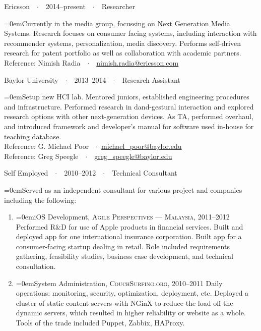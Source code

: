\documentclass[a4paper]{scrartcl}
\newcommand{\Description}[1]{\hangindent=0em\hangafter=0\noindent\footnotesize{#1}\par\normalsize\vspace{1em}} %
\newcommand{\Redvline}[0]{\vspace{0.5em}\noindent{\color{ThemeColor}\rule{16cm}{0.4pt}}}
\newcommand{\MyName}[1]{\noindent{\textsc{\LARGE{\color{ThemeColor}#1}}}} %
\newcommand{\NewBlock}[3]{
    #1\ \ $\cdotp$\ \ #2\ \ $\cdotp$\ \ #3}
\newcommand{\BlockTitle}[1]{\textsc{\vspace{0.15em}}\noindent{\spacedlowsmallcaps{#1}}\vspace{1em}}
\begin{document}

\Redvline

\BlockTitle{Work Experience}

\NewBlock{Ericsson}{2014--present}{Researcher}

\Description{Currently in the media group, focussing on Next Generation Media Systems. Research focuses on consumer facing systems, including interaction with recommender systems, personalization, media discovery. Performs self-driven research for patent portfolio as well as collaboration with academic partners. 
\\Reference: Nimish Radia\ \ $\cdotp$\ \ \href{mailto:nimish.radia@ericsson.com}{nimish.radia@ericsson.com}}  

\NewBlock{Baylor University}{2013--2014}{Research Assistant}

\Description{Setup new HCI lab. Mentored juniors, established engineering procedures and infrastructure. Performed research in dand-gestural interaction and explored research options with other next-generation devices. As TA, performed overhaul, and introduced framework and developer's manual for software used in-house for teaching database. \\
Reference: G. Michael Poor\ \ $\cdotp$\ \href{mailto:michael\_poor@baylor.edu}{michael\_poor@baylor.edu} \\
Reference: Greg Speegle\ \ $\cdotp$\ \ \href{mailto:greg\_speegle@baylor.edu}{greg\_speegle@baylor.edu}}


\NewBlock{Self Employed}{2010--2012}{Technical Consultant}

\Description{Served as an independent consultant for various project and companies including the following:}
\begin{enumerate}
\item[] \Description{iOS Development, \textsc{Agile Perspectives --- Malaysia}, 2011--2012
\newline
Performed R\&D for use of Apple products in financial services. Built and deployed app for one international insurance corporation. Built app for a consumer-facing startup dealing in retail. Role included requirements gathering, feasibility studies, business case development, and technical consultation. }

\item[] \Description{System Administration, \textsc{CouchSurfing.org}, 2010--2011
\newline
Daily operations: monitoring, security, optimization, deployment, etc. Deployed a cluster of static content servers with NGinX to reduce the load off the dynamic servers, which resulted in higher reliability or website as a whole. Tools of the trade included Puppet, Zabbix, HAProxy. }
\end{enumerate}
\end{document}
